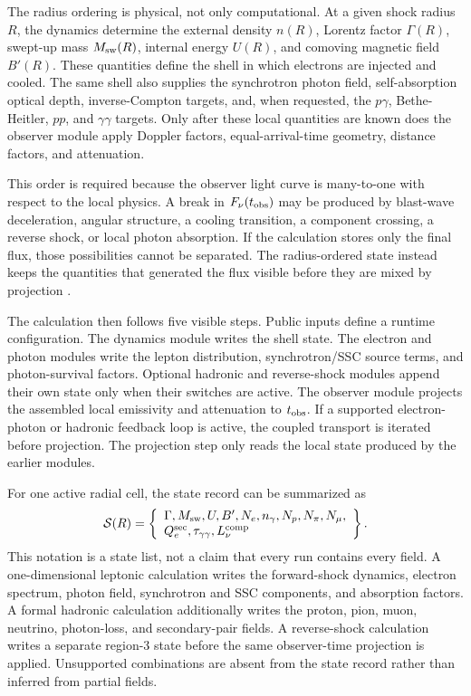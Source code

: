 \documentclass[twocolumn]{aastex702}
\begin{document}
The radius ordering is physical, not only computational.  At a given shock radius \(R\), the dynamics determine the external density \(n(R)\), Lorentz factor \(\Gamma(R)\), swept-up mass \(M_{\rm sw}(R)\), internal energy \(U(R)\), and comoving magnetic field \(B'(R)\).  These quantities define the shell in which electrons are injected and cooled.  The same shell also supplies the synchrotron photon field, self-absorption optical depth, inverse-Compton targets, and, when requested, the \(p\gamma\), Bethe-Heitler, \(pp\), and \(\gamma\gamma\) targets.  Only after these local quantities are known does the observer module apply Doppler factors, equal-arrival-time geometry, distance factors, and attenuation.

This order is required because the observer light curve is many-to-one with respect to the local physics.  A break in \(F_\nu(t_{\rm obs})\) may be produced by blast-wave deceleration, angular structure, a cooling transition, a component crossing, a reverse shock, or local photon absorption.  If the calculation stores only the final flux, those possibilities cannot be separated.  The radius-ordered state instead keeps the quantities that generated the flux visible before they are mixed by projection \citep{Granot2002,vanEerten2010,vanEerten2012,vanEerten2018BlastWaves,Salafia2022JetStructure}.

The calculation then follows five visible steps.  Public inputs define a runtime configuration.  The dynamics module writes the shell state.  The electron and photon modules write the lepton distribution, synchrotron/SSC source terms, and photon-survival factors.  Optional hadronic and reverse-shock modules append their own state only when their switches are active.  The observer module projects the assembled local emissivity and attenuation to \(t_{\rm obs}\).  If a supported electron-photon or hadronic feedback loop is active, the coupled transport is iterated before projection.  The projection step only reads the local state produced by the earlier modules.

For one active radial cell, the state record can be summarized as
\begin{equation}
\mathcal{S}(R)=
\left\{
\begin{array}{l}
\Gamma,M_{\rm sw},U,B',
N_e,n_\gamma,N_p,N_\pi,N_\mu,
\\
Q_e^{\rm sec},\tau_{\gamma\gamma},L_\nu^{\rm comp}
\end{array}
\right\}.
\end{equation}
This notation is a state list, not a claim that every run contains every field.
A one-dimensional leptonic calculation writes the forward-shock dynamics,
electron spectrum, photon field, synchrotron and SSC components, and absorption
factors.  A formal hadronic calculation additionally writes the proton, pion,
muon, neutrino, photon-loss, and secondary-pair fields.  A reverse-shock
calculation writes a separate region-3 state before the same observer-time
projection is applied.  Unsupported combinations are absent from the state
record rather than inferred from partial fields.
\end{document}
